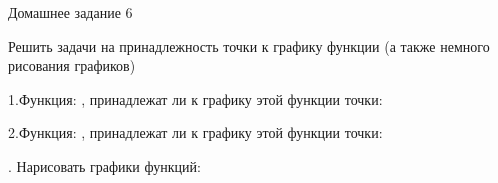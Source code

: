 \documentclass{article}
\begin{document}
{\fontsize{20}{18} \selectfont Домашнее задание 6}
\vspace{0.4cm}




{\fontsize{13}{8} \selectfont  Решить задачи на принадлежность точки к графику функции \color{gray} (а также немного рисования графиков) }

\vspace{1.2cm}

{\fontsize{10}{8} \selectfont 1.Функция: \scalebox{1.2}{$y(x) = 5 \cdot x - 1$}, принадлежат ли к графику этой функции точки: 


\vspace{0.3cm}

}

\vspace{0.7cm}

{\fontsize{10}{8} \selectfont 2.Функция: , принадлежат ли к графику этой функции точки: 


\vspace{0.3cm}

}

\vspace{0.7cm}

{\fontsize{10}{8} . Нарисовать графики функций:  

\vspace{0.4cm}

\scalebox{1.2}{$y(x) = -2 \cdot x + 5$}

\vspace{0.2cm}

\scalebox{1.2}{$y(x) = -x - 4$}

\vspace{0.2cm}

}
\end{document}
